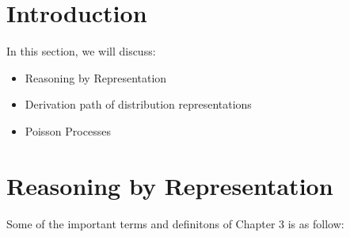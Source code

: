 \documentclass[
  letterpaper,
  DIV=11,
  numbers=noendperiod]{scrreprt}
\providecommand{\tightlist}{%
  \setlength{\itemsep}{0pt}\setlength{\parskip}{0pt}}\usepackage{longtable,booktabs,array}
\theoremstyle{plain}
\theoremstyle{definition}
\theoremstyle{remark}
\begin{document}
\hypertarget{introduction-1}{%
\section*{Introduction}\label{introduction-1}}


In this section, we will discuss:

\begin{itemize}
\tightlist
\item
  Reasoning by Representation
\item
  Derivation path of distribution representations
\item
  Poisson Processes
\end{itemize}

\hypertarget{reasoning-by-representation}{%
\section*{Reasoning by
Representation}\label{reasoning-by-representation}}


Some of the important terms and definitons of Chapter 3 is as follow:
\end{document}
